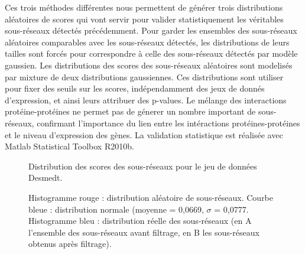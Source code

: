 			Ces trois méthodes différentes nous permettent de générer trois distributions aléatoires de scores qui vont servir pour valider statistiquement les véritables sous-réseaux détectés précédemment.
			Pour garder les ensembles des sous-réseaux aléatoires comparables avec les sous-réseaux détectés, les distributions de leurs tailles sont forcés pour correspondre à celle des sous-réseaux détectés par modèle gaussien.
			Les distributions des scores des sous-réseaux aléatoires sont modelisés par mixture de deux distributions gaussiennes.
			Ces distributions sont utiliser pour fixer des seuils sur les scores, indépendamment des jeux de donnés d'expression, et ainsi leurs attribuer des p-values.
			Le mélange des interactions protéine-protéines ne permet pas de génerer un nombre important de sous-réseaux, confirmant l'importance du lien entre les intéractions protéines-protéines et le niveau d'expression des gènes.
			La validation statistique est réalisée avec Matlab Statistical Toolbox R2010b.

			\begin{figure}
				\begin{center}
					\def\svgwidth{\columnwidth}
					\caption{Distribution des scores des sous-réseaux pour le jeu de données Desmedt.}
					\caption*{Histogramme rouge : distribution aléatoire de sous-réseaux. Courbe bleue : distribution normale (moyenne = 0,0669, $\sigma$ = 0,0777. Histogramme bleu : distribution réelle des sous-réseaux (en A l'ensemble des sous-réseaux avant filtrage, en B les sous-réseaux obtenus après filtrage).}
					\label{fig:Distribution}
				\end{center}
			\end{figure}

